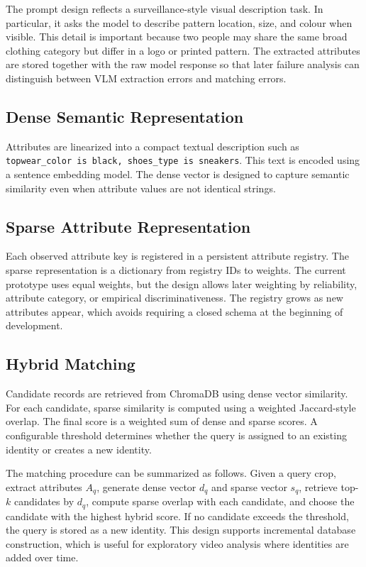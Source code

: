 The prompt design reflects a surveillance-style visual description task. In particular, it asks the model to describe pattern location, size, and colour when visible. This detail is important because two people may share the same broad clothing category but differ in a logo or printed pattern. The extracted attributes are stored together with the raw model response so that later failure analysis can distinguish between VLM extraction errors and matching errors.

\subsection{Dense Semantic Representation}

Attributes are linearized into a compact textual description such as \texttt{topwear\_color is black, shoes\_type is sneakers}. This text is encoded using a sentence embedding model. The dense vector is designed to capture semantic similarity even when attribute values are not identical strings.

\subsection{Sparse Attribute Representation}

Each observed attribute key is registered in a persistent attribute registry. The sparse representation is a dictionary from registry IDs to weights. The current prototype uses equal weights, but the design allows later weighting by reliability, attribute category, or empirical discriminativeness. The registry grows as new attributes appear, which avoids requiring a closed schema at the beginning of development.

\subsection{Hybrid Matching}

Candidate records are retrieved from ChromaDB using dense vector similarity. For each candidate, sparse similarity is computed using a weighted Jaccard-style overlap. The final score is a weighted sum of dense and sparse scores. A configurable threshold determines whether the query is assigned to an existing identity or creates a new identity.

The matching procedure can be summarized as follows. Given a query crop, extract attributes $A_q$, generate dense vector $d_q$ and sparse vector $s_q$, retrieve top-$k$ candidates by $d_q$, compute sparse overlap with each candidate, and choose the candidate with the highest hybrid score. If no candidate exceeds the threshold, the query is stored as a new identity. This design supports incremental database construction, which is useful for exploratory video analysis where identities are added over time.

